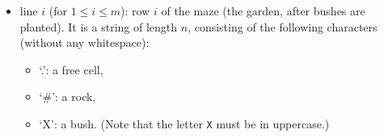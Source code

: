 \begin{itemize}
\item line $i$ (for $1 \leq i \leq m$): row $i$ of the maze (the garden, after bushes are planted). It is a string of length $n$, consisting of the following characters (without any whitespace):
\begin{itemize}
\item `.': a free cell,
\item `\#': a rock,
\item `X': a bush. (Note that the letter \texttt{X} must be in uppercase.)
\end{itemize}
\end{itemize}